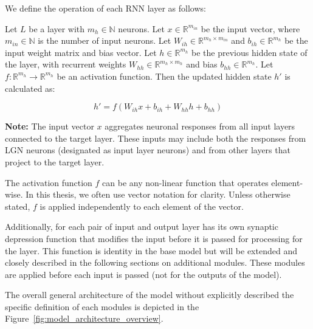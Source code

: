 We define the operation of each RNN layer as follows:

\begin{defn}
    Let $L$ be a layer with $m_h \in \mathbb{N}$ neurons. Let $x \in \mathbb{R}^{m_{in}}$ be the input vector, where $m_{in} \in \mathbb{N}$ is the number of input neurons. Let $W_{ih} \in \mathbb{R}^{m_h \times m_{in}}$ and $b_{ih} \in \mathbb{R}^{m_h}$ be the input weight matrix and bias vector. Let $h \in \mathbb{R}^{m_h}$ be the previous hidden state of the layer, with recurrent weights $W_{hh} \in \mathbb{R}^{m_h \times m_h}$ and bias $b_{hh} \in \mathbb{R}^{m_h}$. Let $f: \mathbb{R}^{m_h} \to \mathbb{R}^{m_h}$ be an activation function. Then the updated hidden state $h'$ is calculated as:
    
    $$h' = f\left(W_{ih}x + b_{ih} + W_{hh}h + b_{hh}\right)$$

    \textbf{Note:} The input vector $x$ aggregates neuronal responses from all input layers connected to the target layer. These inputs may include both the responses from LGN neurons (designated as input layer neurons) and from other layers that project to the target layer. 
\end{defn}
\label{def:base_neuron}

The activation function $f$ can be any non-linear function that operates element-wise. In this thesis, we often use vector notation for clarity. Unless otherwise stated, $f$ is applied independently to each element of the vector.

Additionally, for each pair of input and output layer has its own synaptic depression function that modifies the input before it is passed for processing for the layer. This function is identity in the base model but will be extended and closely described in the following sections on additional modules. These modules are applied before each input is passed (not for the outputs of the model).

The overall general architecture of the model without explicitly described the specific definition of each modules is depicted in the Figure~\ref{fig:model_architecture_overview}.

